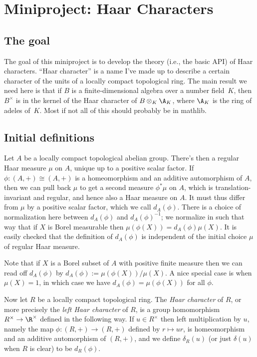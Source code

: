 \chapter{Miniproject: Haar Characters}\label{Haar_char_project}

\section{The goal}

The goal of this miniproject is to develop the theory (i.e., the basic API) of Haar characters.
``Haar character'' is a name I've made up to describe a certain character of the units of a locally
compact topological ring. The main result we need here is that if $B$ is a finite-dimensional
algebra over a number field~$K$, then $B^\times$ is in the kernel of the Haar character
of $B\otimes_K\A_K$, where $\A_K$ is the ring of adeles of~$K$. Most if not all of this
should probably be in mathlib.

\section{Initial definitions}

Let $A$ be a locally compact topological abelian group. There's then a regular Haar measure $\mu$
on $A$, unique up to a positive scalar factor. If $\phi:(A,+)\cong(A,+)$ is a homeomorphism
and an additive automorphism of $A$, then we can pull back $\mu$
to get a second measure $\phi^*\mu$ on $A$, which is translation-invariant and regular,
and hence also a Haar measure on $A$. It must thus differ from $\mu$ by a positive scalar
factor, which we call $d_A(\phi)$. There is a choice of normalization here between $d_A(\phi)$
and $d_A(\phi)^{-1}$; we normalize in such that way that
if $X$ is Borel measurable then $\mu(\phi(X))=d_A(\phi)\mu(X)$.
It is easily checked that the definition of $d_A(\phi)$ is independent of the initial choice
$\mu$ of regular Haar measure.

Note that if $X$ is a Borel subset of $A$ with positive finite measure then we can read
off $d_A(\phi)$ by $d_A(\phi):=\mu(\phi(X))/\mu(X)$. A nice special case is when
$\mu(X)=1$, in which case we have $d_A(\phi)=\mu(\phi(X))$ for all $\phi$.

Now let $R$ be a locally compact topological ring. The \emph{Haar character} of $R$,
or more precisely the \emph{left Haar character} of $R$, is a group homomorphism
$R^\times\to\R^\times$ defined in the following way. If $u\in R^\times$ then left multiplication
by $u$, namely the map $\phi:(R,+)\to(R,+)$ defined by $r\mapsto ur$, is homeomorphism and
an additive automorphism of $(R,+)$, and we define $\delta_R(u)$ (or just $\delta(u)$ when
$R$ is clear) to be $d_R(\phi)$.

